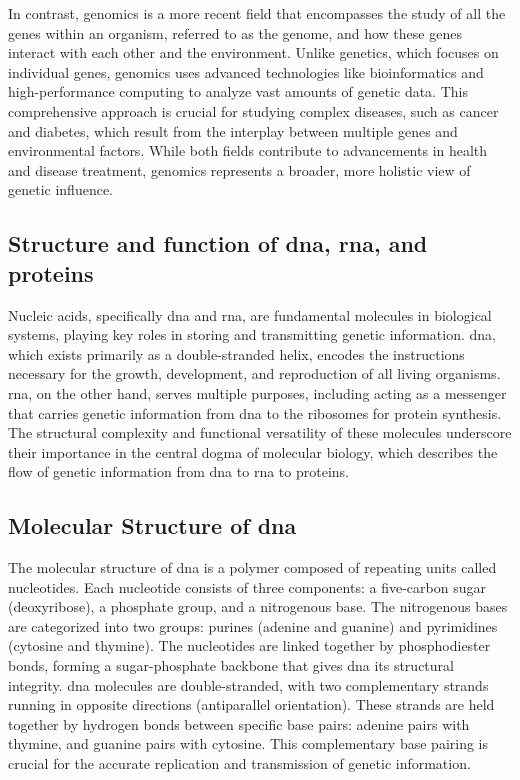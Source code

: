 In contrast, genomics is a more recent field that encompasses the study of all the genes within an organism, referred to as the genome, and how these genes interact with each other and the environment. Unlike genetics, which focuses on individual genes, genomics uses advanced technologies like bioinformatics and high-performance computing to analyze vast amounts of genetic data. This comprehensive approach is crucial for studying complex diseases, such as cancer and diabetes, which result from the interplay between multiple genes and environmental factors. While both fields contribute to advancements in health and disease treatment, genomics represents a broader, more holistic view of genetic influence. \cite{JAX2017}

\subsection{Structure and function of \acs{dna}, \acs{rna}, and proteins} \label{subsec:genetics_structure}

Nucleic acids, specifically  \ac{dna} and \ac{rna}, are fundamental molecules in biological systems, playing key roles in storing and transmitting genetic information. \ac{dna}, which exists primarily as a double-stranded helix, encodes the instructions necessary for the growth, development, and reproduction of all living organisms. \ac{rna}, on the other hand, serves multiple purposes, including acting as a messenger that carries genetic information from \ac{dna} to the ribosomes for protein synthesis. The structural complexity and functional versatility of these molecules underscore their importance in the central dogma of molecular biology, which describes the flow of genetic information from \ac{dna} to \ac{rna} to proteins. \cite{Minchin2019}

\subsection{Molecular Structure of \acs{dna}} \label{subsec:genetics_molecular}

The molecular structure of \ac{dna} is a polymer composed of repeating units called nucleotides. Each nucleotide consists of three components: a five-carbon sugar (deoxyribose), a phosphate group, and a nitrogenous base. The nitrogenous bases are categorized into two groups: purines (adenine and guanine) and pyrimidines (cytosine and thymine). The nucleotides are linked together by phosphodiester bonds, forming a sugar-phosphate backbone that gives \ac{dna} its structural integrity. \ac{dna} molecules are double-stranded, with two complementary strands running in opposite directions (antiparallel orientation). These strands are held together by hydrogen bonds between specific base pairs: adenine pairs with thymine, and guanine pairs with cytosine. This complementary base pairing is crucial for the accurate replication and transmission of genetic information. \cite{Minchin2019}

